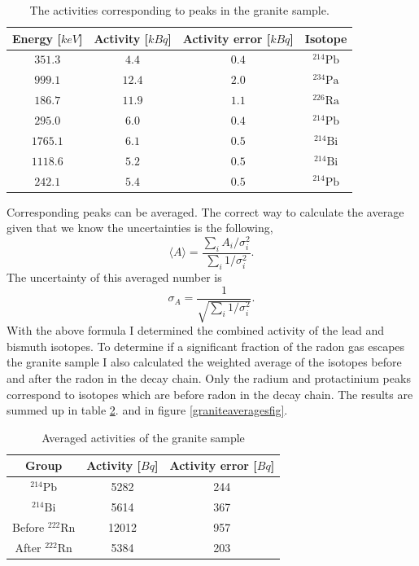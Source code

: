 \documentclass[pdftex,12pt,a4paper]{article}
\begin{document}
		\begin{table}[H]
		\centering
		\begin{tabular}{|c|c|c|c|}
			\hline
			Energy [$keV$] & Activity [$kBq$]& Activity error [$kBq$]& Isotope \\
			\hline
            $351.3$ & $4.4$ & $0.4$ & $^{214}\text{Pb}$ \\
            $999.1$ & $12.4$ & $2.0$ & $^{234}\text{Pa}$ \\
            $186.7$ & $11.9$ & $1.1$ & $^{226}\text{Ra}$ \\
            $295.0$ & $6.0$ & $0.4$ & $^{214}\text{Pb}$ \\
            $1765.1$ & $6.1$ & $0.5$ & $^{214}\text{Bi}$ \\
            $1118.6$ & $5.2$ & $0.5$ & $^{214}\text{Bi}$ \\
            $242.1$ & $5.4$ & $0.5$ & $^{214}\text{Pb}$ \\
			\hline
		\end{tabular}
		\caption{The activities corresponding to peaks in the granite sample.}
		 \label{granitepeaks}
		\end{table}
		Corresponding peaks can be averaged. The correct way to calculate the average given that we know the uncertainties is the following,
		\begin{equation}
			\langle A\rangle = \frac{\sum_i A_i / \sigma_i^2}{\sum_i 1 / \sigma_i^2}.
		\end{equation}
		The uncertainty of this averaged number is
		\begin{equation}
			\sigma_A = \frac{1}{\sqrt{\sum_i 1 / \sigma_i^2}}.
		\end{equation}
		With the above formula I determined the combined activity of the lead and bismuth isotopes. To determine if a significant fraction of the radon gas escapes the granite sample I also calculated the weighted average of the isotopes before and after the radon in the decay chain. Only the radium and protactinium peaks correspond to isotopes which are before radon in the decay chain. The results are summed up in table \ref{graniteaverages}. and in figure \ref{graniteaveragesfig}.
		\begin{table}[H]
		\centering
		\begin{tabular}{|c|c|c|}
			\hline
			Group & Activity [$Bq$] & Activity error [$Bq$] \\
			\hline
            $^{214}\text{Pb}$ & 5282 & 244 \\
            $^{214}\text{Bi}$ & 5614 & 367 \\
            Before $^{222}\text{Rn}$ & 12012 & 957 \\
            After $^{222}\text{Rn}$ & 5384 & 203 \\
            \hline
		\end{tabular}
		\caption{Averaged activities of the granite sample}
		\label{graniteaverages}
		\end{table}
\end{document}
